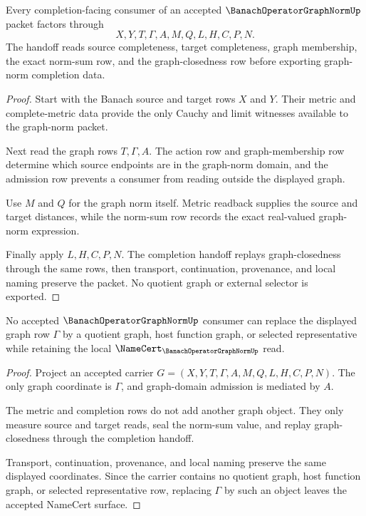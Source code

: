 \begin{theorem}
\label{thm:banach-operator-graph-norm-completion-handoff}
Every completion-facing consumer of an accepted $\BanachOperatorGraphNormUp$ packet factors through
$$
X,Y,T,\Gamma,A,M,Q,L,H,C,P,N .
$$
The handoff reads source completeness, target completeness, graph membership, the exact norm-sum row, and the graph-closedness row before exporting graph-norm completion data.
\end{theorem}
\begin{proof}
Start with the Banach source and target rows $X$ and $Y$. Their metric and complete-metric data provide the only Cauchy and limit witnesses available to the graph-norm packet.

Next read the graph rows $T,\Gamma,A$. The action row and graph-membership row determine which source endpoints are in the graph-norm domain, and the admission row prevents a consumer from reading outside the displayed graph.

Use $M$ and $Q$ for the graph norm itself. Metric readback supplies the source and target distances, while the norm-sum row records the exact real-valued graph-norm expression.

Finally apply $L,H,C,P,N$. The completion handoff replays graph-closedness through the same rows, then transport, continuation, provenance, and local naming preserve the packet. No quotient graph or external selector is exported.
\end{proof}

\begin{theorem}
\label{thm:banach-operator-graph-norm-no-quotient-graph}
No accepted $\BanachOperatorGraphNormUp$ consumer can replace the displayed graph row $\Gamma$ by a quotient graph, host function graph, or selected representative while retaining the local $\NameCert_{\BanachOperatorGraphNormUp}$ read.
\end{theorem}
\begin{proof}
Project an accepted carrier $G=(X,Y,T,\Gamma,A,M,Q,L,H,C,P,N)$. The only graph coordinate is $\Gamma$, and graph-domain admission is mediated by $A$.

The metric and completion rows do not add another graph object. They only measure source and target reads, seal the norm-sum value, and replay graph-closedness through the completion handoff.

Transport, continuation, provenance, and local naming preserve the same displayed coordinates. Since the carrier contains no quotient graph, host function graph, or selected representative row, replacing $\Gamma$ by such an object leaves the accepted NameCert surface.
\end{proof}

